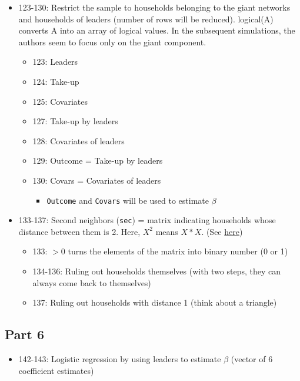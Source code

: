 \documentclass[10pt,letterpaper]{article}
\begin{document}
\begin{itemize}
\begin{itemize}
      \item 123-130: Restrict the sample to households belonging to the giant networks and households of leaders (number of rows will be reduced). logical(A) converts A into an array of logical values. In the subsequent simulations, the authors seem to focus only on the giant component.
        \begin{itemize}
          \item 123: Leaders
          \item 124: Take-up
          \item 125: Covariates
          \item 127: Take-up by leaders
          \item 128: Covariates of leaders
          \item 129: Outcome = Take-up by leaders
          \item 130: Covars = Covariates of leaders
            \begin{itemize}
              \item \texttt{Outcome} and \texttt{Covars} will be used to estimate $\beta$
            \end{itemize}
        \end{itemize}
      \item 133-137: Second neighbors (\texttt{sec}) = matrix indicating households whose distance between them is 2.
        Here, $X^2$ means $X * X$.
        (See \href{https://en.wikipedia.org/wiki/Adjacency_matrix#Matrix_powers}{here})
        \begin{itemize}
		  \item 133: $>0$ turns the elements of the matrix into binary number (0 or 1)
          \item 134-136: Ruling out households themselves (with two steps, they can always come back to themselves)
          \item 137: Ruling out households with distance 1 (think about a triangle)
        \end{itemize}
    \end{itemize}
\end{itemize}

\subsection*{Part 6}
\begin{itemize}
  \item 142-143: Logistic regression by using leaders to estimate $\beta$ (vector of 6 coefficient estimates)
\end{itemize}
\end{document}
